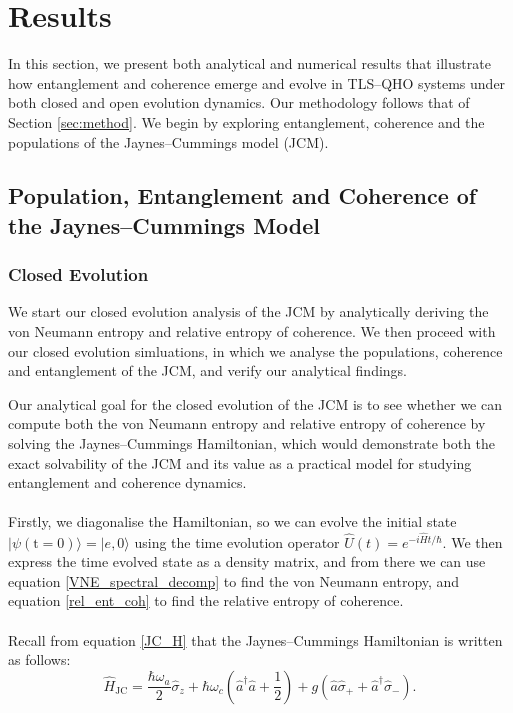 \documentclass[11pt]{article}
\newcounter{subsubsubsection}[subsubsection]
\begin{document}
\newpage
\section{Results} \label{sec:results}
In this section, we present both analytical and numerical results that illustrate how entanglement and coherence emerge and evolve in TLS--QHO systems under both closed and open evolution dynamics. Our methodology follows that of Section \ref{sec:method}. We begin by exploring entanglement, coherence and the populations of the Jaynes--Cummings model (JCM). 

\subsection{Population, Entanglement and Coherence of the Jaynes--Cummings Model}  \label{sec:results_JCM}
\subsubsection{Closed Evolution}

We start our closed evolution analysis of the JCM by analytically deriving the von Neumann entropy and relative entropy of coherence. We then proceed with our closed evolution simluations, in which we analyse the populations, coherence and entanglement of the JCM, and verify our analytical findings.


Our analytical goal for the closed evolution of the JCM is to see whether we can compute both the von Neumann entropy and relative entropy of coherence by solving the Jaynes--Cummings Hamiltonian, which would demonstrate both the exact solvability of the JCM and its value as a practical model for studying entanglement and coherence dynamics.\\
\\
Firstly, we diagonalise the Hamiltonian, so we can evolve the initial state $|\psi (\text{t}=0)\rangle = |e, 0\rangle$ using the time evolution operator $\hat{U}(t) = e^{-i\hat{H}t/\hbar}$. We then express the time evolved state as a density matrix, and from there we can use equation \eqref{VNE_spectral_decomp} to find the von Neumann entropy, and equation \eqref{rel_ent_coh} to find the relative entropy of coherence.\\
\\
Recall from equation \eqref{JC_H} that the Jaynes--Cummings Hamiltonian is written as follows:
\begin{equation*}
        \hat{H}_{\scriptscriptstyle \text{JC}} = \frac{\hbar\omega_a}{2}\hat{\sigma}_z + \hbar\omega_c\left(\hat{a}^\dagger \hat{a} + \frac{1}{2} \right) + g(\hat{a}\hat{\sigma}_{+} + \hat{a}^\dagger\hat{\sigma}_{-}).
\end{equation*}
\end{document}
